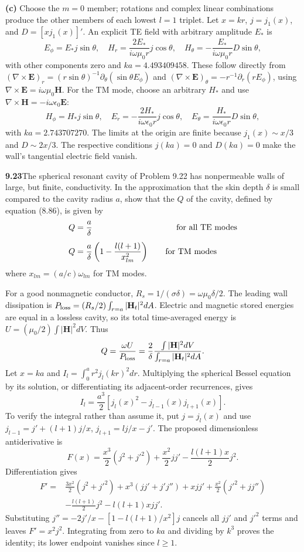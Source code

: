 \textbf{(c)} Choose the $m=0$ member; rotations and complex linear
combinations produce the other members of each lowest $l=1$ triplet.
Let $x=kr$, $j=j_1(x)$, and $D=[xj_1(x)]'$.
An explicit TE field with arbitrary amplitude $E_*$ is
\[
\boxed{E_\phi=E_*j\sin\theta,\quad
H_r=\frac{2E_*}{i\omega\mu_0r}j\cos\theta,\quad
H_\theta=-\frac{E_*}{i\omega\mu_0r}D\sin\theta,}
\]
with other components zero and $ka=4.493409458$.
These follow directly from
$(\nabla\times\mathbf E)_r=(r\sin\theta)^{-1}
\partial_\theta(\sin\theta E_\phi)$ and
$(\nabla\times\mathbf E)_\theta=-r^{-1}\partial_r(rE_\phi)$,
using $\nabla\times\mathbf E=i\omega\mu_0\mathbf H$.
For the TM mode, choose an arbitrary $H_*$ and use
$\nabla\times\mathbf H=-i\omega\epsilon_0\mathbf E$:
\[
\boxed{H_\phi=H_*j\sin\theta,\quad
E_r=-\frac{2H_*}{i\omega\epsilon_0r}j\cos\theta,\quad
E_\theta=\frac{H_*}{i\omega\epsilon_0r}D\sin\theta,}
\]
with $ka=2.743707270$. The limits at the origin are finite because
$j_1(x)\sim x/3$ and $D\sim2x/3$. The respective conditions $j(ka)=0$
and $D(ka)=0$ make the wall's tangential electric field vanish.

\par\bigskip
\noindent\textbf{9.23}\quad The spherical resonant cavity of Problem 9.22 has nonpermeable walls of large, but finite, conductivity. In the approximation that the skin depth $\delta$ is small compared to the cavity radius $a$, show that the $Q$ of the cavity, defined by equation (8.86), is given by
\begin{align*}
Q&=\frac{a}{\delta}\hspace{3.6cm}\text{for all TE modes}\\[4pt]
Q&=\frac{a}{\delta}\left(1-\frac{l(l+1)}{x_{lm}^{2}}\right)\qquad\text{for TM modes}
\end{align*}
where $x_{lm}=(a/c)\omega_{lm}$ for TM modes.
\solution

For a good nonmagnetic conductor,
$R_s=1/(\sigma\delta)=\omega\mu_0\delta/2$.
The leading wall dissipation is
$P_{\rm loss}=(R_s/2)\int_{r=a}|\mathbf H_t|^2dA$.
Electric and magnetic stored energies are equal in a lossless cavity,
so its total time-averaged energy is
$U=(\mu_0/2)\int|\mathbf H|^2dV$. Thus
\[
Q=\frac{\omega U}{P_{\rm loss}}
=\frac2\delta\frac{\int|\mathbf H|^2dV}
{\int_{r=a}|\mathbf H_t|^2dA}.
\]
Let $x=ka$ and $I_l=\int_0^a r^2j_l(kr)^2dr$. Multiplying the spherical
Bessel equation by its solution, or differentiating its adjacent-order
recurrences, gives
\[
I_l=\frac{a^3}{2}[j_l(x)^2-j_{l-1}(x)j_{l+1}(x)].
\]
To verify the integral rather than assume it, put $j=j_l(x)$ and
use $j_{l-1}=j'+(l+1)j/x$, $j_{l+1}=lj/x-j'$. The proposed
dimensionless antiderivative is
\[
F(x)=\frac{x^3}{2}(j^2+j'^2)+\frac{x^2}{2}jj'
-\frac{l(l+1)x}{2}j^2.
\]
Differentiation gives
\begin{align*}
F'={}&\frac{3x^2}{2}(j^2+j'^2)+x^3(jj'+j'j'')
+xjj'+\frac{x^2}{2}(j'^2+jj'')\\
&-\frac{l(l+1)}2j^2-l(l+1)xjj'.
\end{align*}
Substituting $j''=-2j'/x-[1-l(l+1)/x^2]j$ cancels all $jj'$
and $j'^2$ terms and leaves $F'=x^2j^2$. Integrating from zero to
$ka$ and dividing by $k^3$ proves the identity; its lower endpoint
vanishes since $l\ge1$.

